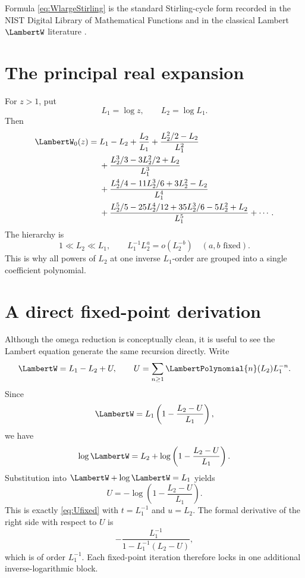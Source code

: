 \documentclass[11pt,oneside,openany]{book}
\begin{document}
Formula \cref{eq:WlargeStirling} is the standard Stirling-cycle form recorded
in the NIST Digital Library of Mathematical Functions and in the classical
Lambert \(\LambertW\) literature \cite{Corless1996,DLMF,JeffreyCorlessKnuth1997}.

\section{The principal real expansion}
For \(z>1\), put
\begin{equation}\label{eq:L1L2again}
 L_1=\log z,
 \qquad
 L_2=\log L_1.
\end{equation}
Then
\begin{align}
 \LambertW_0(z)={}&L_1-L_2+\frac{L_2}{L_1}
 +\frac{L_2^2/2-L_2}{L_1^2}\notag\\
 &+\frac{L_2^3/3-3L_2^2/2+L_2}{L_1^3}\notag\\
 &+\frac{L_2^4/4-11L_2^3/6+3L_2^2-L_2}{L_1^4}\notag\\
 &+\frac{L_2^5/5-25L_2^4/12+35L_2^3/6-5L_2^2+L_2}{L_1^5}
 +\cdots.
 \label{eq:Wprincipalexpanded}
\end{align}
The hierarchy is
\[
 1\ll L_2\ll L_1,
 \qquad
 L_1^{-1}L_2^a=o(L_2^{-b})
 \quad(a,b\text{ fixed}).
\]
This is why all powers of \(L_2\) at one inverse \(L_1\)-order are grouped
into a single coefficient polynomial.

\section{A direct fixed-point derivation}
Although the omega reduction is conceptually clean, it is useful to see the
Lambert equation generate the same recursion directly.  Write
\begin{equation}\label{eq:Wansatzdirect}
 \LambertW=L_1-L_2+U,
 \qquad
 U=\sum_{n\geq1}\LambertPolynomial{n}(L_2)L_1^{-n}.
\end{equation}
Since
\[
 \LambertW=L_1\left(1-\frac{L_2-U}{L_1}\right),
\]
we have
\[
 \log \LambertW=L_2+
 \log\left(1-\frac{L_2-U}{L_1}\right).
\]
Substitution into \(\LambertW+\log \LambertW=L_1\) yields
\begin{equation}\label{eq:Wdirectfixed}
 U=-\log\left(1-\frac{L_2-U}{L_1}\right).
\end{equation}
This is exactly \cref{eq:Ufixed} with \(t=L_1^{-1}\) and \(u=L_2\).  The
formal derivative of the right side with respect to \(U\) is
\[
 -\frac{L_1^{-1}}{1-L_1^{-1}(L_2-U)},
\]
which is of order \(L_1^{-1}\).  Each fixed-point iteration therefore locks in
one additional inverse-logarithmic block.
\end{document}

